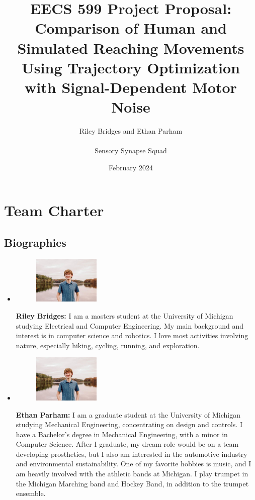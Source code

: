 \documentclass[table,12pt]{article}
\title{\textbf{EECS 599 Project Proposal:} \\
    Comparison of Human and Simulated Reaching Movements Using Trajectory Optimization with Signal-Dependent Motor Noise}
\author{Riley Bridges and Ethan Parham \\\\
    Sensory Synapse Squad}
\date{February 2024}
\begin{document}
\maketitle
\newpage

\section{Team Charter}
\subsection{Biographies}
\begin{itemize}
    \item \begin{figure}[H]
        \centering
        \includegraphics[width=0.3\textwidth]{riley_picture.jpg}
    \end{figure}
    \textbf{Riley Bridges:} I am a masters student at the University of Michigan studying Electrical and Computer Engineering. My main background and interest is in computer science and robotics. I love most activities involving nature, especially hiking, cycling, running, and exploration.

    \item \begin{figure}[H]
        \centering
        \includegraphics[width=0.3\textwidth]{riley_picture.jpg} %
    \end{figure}
    \textbf{Ethan Parham:} I am a graduate student at the University of Michigan studying Mechanical Engineering, concentrating on design and controls. I have a Bachelor's degree in Mechanical Engineering, with a minor in Computer Science. After I graduate, my dream role would be on a team developing prosthetics, but I also am interested in the automotive industry and environmental sustainability. One of my favorite hobbies is music, and I am heavily involved with the athletic bands at Michigan. I play trumpet in the Michigan Marching band and Hockey Band, in addition to the trumpet ensemble. 
\end{itemize}
\end{document}
